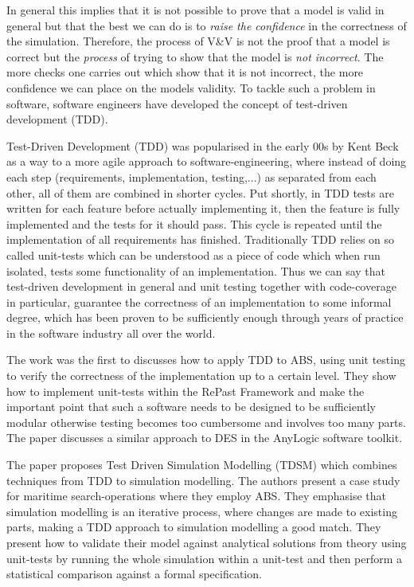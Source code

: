 In general this implies that it is not possible to prove that a model is valid in general but that the best we can do is to \textit{raise the confidence} in the correctness of the simulation. Therefore, the process of V\&V is not the proof that a model is correct but the \textit{process} of trying to show that the model is \textit{not incorrect}. The more checks one carries out which show that it is not incorrect, the more confidence we can place on the models validity. To tackle such a problem in software, software engineers have developed the concept of test-driven development (TDD).

Test-Driven Development (TDD) was popularised in the early 00s by Kent Beck \cite{beck_test_2002} as a way to a more agile approach to software-engineering, where instead of doing each step (requirements, implementation, testing,...) as separated from each other, all of them are combined in shorter cycles. Put shortly, in TDD tests are written for each feature before actually implementing it, then the feature is fully implemented and the tests for it should pass. This cycle is repeated until the implementation of all requirements has finished. Traditionally TDD relies on so called unit-tests which can be understood as a piece of code which when run isolated, tests some functionality of an implementation. Thus we can say that test-driven development in general and unit testing together with code-coverage in particular, guarantee the correctness of an implementation to some informal degree, which has been proven to be sufficiently enough through years of practice in the software industry all over the world. 

\medskip

The work \cite{collier_test-driven_2013} was the first to discusses how to apply TDD to ABS, using unit testing to verify the correctness of the implementation up to a certain level. They show how to implement unit-tests within the RePast Framework \cite{north_complex_2013} and make the important point that such a software needs to be designed to be sufficiently modular otherwise testing becomes too cumbersome and involves too many parts. The paper \cite{asta_investigation_2014} discusses a similar approach to DES in the AnyLogic software toolkit. 

The paper \cite{onggo_test-driven_2016} proposes Test Driven Simulation Modelling (TDSM) which combines techniques from TDD to simulation modelling. The authors present a case study for maritime search-operations where they employ ABS. They emphasise that simulation modelling is an iterative process, where changes are made to existing parts, making a TDD approach to simulation modelling a good match. They present how to validate their model against analytical solutions from theory using unit-tests by running the whole simulation within a unit-test and then perform a statistical comparison against a formal specification. %

